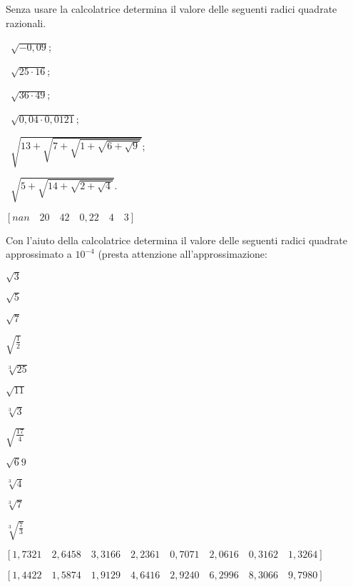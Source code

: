 \begin{esercizio}
 \label{ese:2.02}
Senza usare la calcolatrice determina il valore delle seguenti radici 
quadrate razionali.
\vspace{-.7em}
\begin{multicols}{2}
 \begin{enumeratea}
 \item~$\sqrt{-0,09}$;
 \item~$\sqrt{25\cdot 16}$;
 \item~$\sqrt{36\cdot 49}$;
 \item~$\sqrt{0,04\cdot 0,0121}$;
 \item~$\sqrt{13+\sqrt{7+\sqrt{1+\sqrt{6+\sqrt 9}}}}$;
 \item~$\sqrt{5+\sqrt{14+\sqrt{2+\sqrt 4}}}$.
 \end{enumeratea}
 \end{multicols}
\begin{flushright}
\vspace*{-8pt}
$[nan \quad 20 \quad 42 \quad 0,22 \quad 4 \quad 3]$
\end{flushright}
\vspace{-.7em}
\end{esercizio}

\begin{esercizio}
 \label{ese:2.03}
Con l'aiuto della calcolatrice determina il valore delle seguenti radici 
quadrate approssimato a $10^{-4}$ (presta attenzione all'approssimazione:
\vspace{-.7em}
 \begin{multicols}{4}
 \begin{enumeratea}
 \item $\sqrt 3$
 \item $\sqrt 5$
 \item $\sqrt 7$
 \item $\sqrt{\frac 1 2}$
 \item $\sqrt[3]{25}$
 \item $\sqrt{11}$
 \item $\sqrt[3]3$
 \item $\sqrt{\frac{17} 4}$
 \item $\sqrt 69$
 \item $\sqrt[3]4$
 \item $\sqrt[3]7$
 \item $\sqrt[3]{\frac{7}{3}}$
 \end{enumeratea}
 \end{multicols}
\begin{flushright}
\vspace*{-8pt}
$[1,7321 \quad 2,6458 \quad 3,3166 \quad 2,2361 \quad 0,7071 \quad 
  2,0616 \quad 0,3162 \quad 1,3264]$
  
$[1,4422 \quad 1,5874 \quad 1,9129 \quad
  4,6416 \quad 2,9240 \quad 6,2996 \quad 8,3066 \quad 9,7980]$
\end{flushright}
\end{esercizio}
\vspace{-1.0em}

